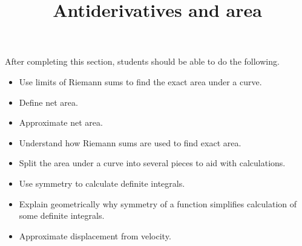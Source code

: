 \documentclass{ximera}
\title{Antiderivatives and area}
\begin{document}
\begin{abstract}
\end{abstract}

\maketitle

\begin{sectionOutcomes}

After completing this section, students should be able to do the following.

\begin{itemize}
	\item Use limits of Riemann sums to find the exact area under a curve.
	\item Define net area.
	\item Approximate net area.
	\item Understand how Riemann sums are used to find exact area.
	\item Split the area under a curve into several pieces to aid with calculations.
	\item Use symmetry to calculate definite integrals.
	\item Explain geometrically why symmetry of a function simplifies calculation of some definite integrals.
	\item Approximate displacement from velocity.
\end{itemize}

\end{sectionOutcomes}
\end{document}
